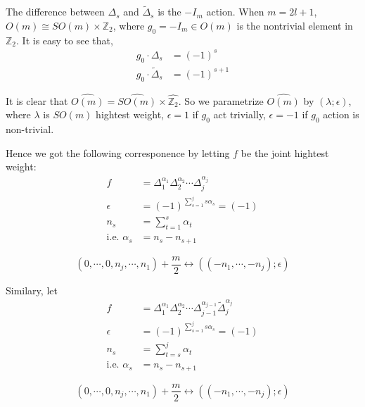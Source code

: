 \documentclass[12pt]{amsart}
\def\bZ{{\mathbb{Z}}}
\def\tDelta{\widetilde{\Delta}}
\begin{document}
The difference between $\Delta_s$ and $\tDelta_s$ is the $-I_m$ action.
When $m=2l+1$, $O(m) \cong SO(m)\times \bZ_2$, where $g_0=-I_m\in O(m)$ 
is the nontrivial element in $\bZ_2$. It is easy to see that, 
\begin{align*}
g_0\cdot \Delta_s &= (-1)^s\\
g_0\cdot \tDelta_s & = (-1)^{s+1}
\end{align*}

It is clear that $\widehat{O(m)} = \widehat{SO(m)}\times \widehat{\bZ_2}$. 
So we parametrize $\widehat{O(m)}$ by $(\lambda; \epsilon)$, where $\lambda$
is $SO(m)$ hightest weight, $\epsilon=1$ if $g_0$ act trivially, $\epsilon=-1$
if $g_0$ action is non-trivial.   

Hence we got the following corresponence by letting $f$ be the joint hightest weight:
\begin{align*}
f &= \Delta_1^{\alpha_1}\Delta_2^{\alpha_2} \cdots \Delta_j^{\alpha_j}\\
\epsilon &= (-1)^{\sum_{s=1}^j s\alpha_s} = (-1)^{}\\
n_s &= \sum_{t=1}^s \alpha_t\\
\text{i.e. } \alpha_s &= n_s-n_{s+1}
\end{align*}

\[
(0,\cdots, 0, n_j, \cdots, n_1)+\frac{m}{2}
\leftrightarrow
((-n_1, \cdots, -n_j); \epsilon)
\]
 
Similary, let
\begin{align*}
f &= \Delta_1^{\alpha_1}\Delta_2^{\alpha_2} \cdots \Delta_{j-1}^{\alpha_{j-1}}\tDelta_j^{\alpha_j}\\
\epsilon &= (-1)^{\sum_{s=1}^j s\alpha_s} = (-1)^{}\\
n_s &= \sum_{t=s}^j \alpha_t\\
\text{i.e. } \alpha_s &= n_s-n_{s+1}
\end{align*}

\[
(0,\cdots, 0, n_j, \cdots, n_1)+\frac{m}{2}
\leftrightarrow
((-n_1, \cdots, -n_j); \epsilon)
\]






{}

\end{document}
